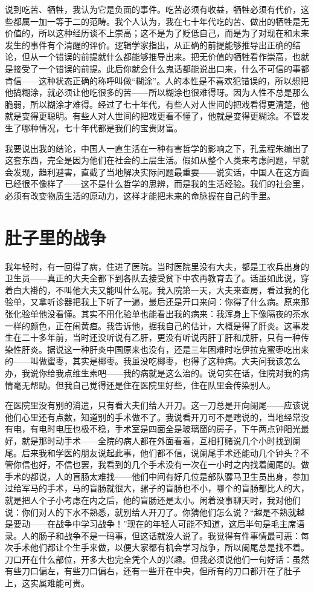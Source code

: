 说到吃苦、牺牲，我认为它是负面的事件。吃苦必须有收益，牺牲必须有代价，这些都属一加一等于二的范畴。我个人认为，我在七十年代吃的苦、做出的牺牲是无价值的，所以这种经历谈不上崇高；这不是为了贬低自己，而是为了对现在和未来发生的事件有个清醒的评价。逻辑学家指出，从正确的前提能够推导出正确的结论，但从一个错误的前提就什么都能够推导出来。把无价值的牺牲看作崇高，也就是接受了一个错误的前提。此后你就会什么鬼话都能说出口来，什么不可信的事都肯信——这种状态正确的称呼叫做“糊涂”。人的本性是不喜欢犯错误的，所以想把他搞糊涂，就必须让他吃很多的苦——所以糊涂也很难得呀。因为人性不总是那么脆弱，所以糊涂才难得。经过了七十年代，有些人对人世间的把戏看得更清楚，他就是变得更聪明。有些人对人世间的把戏更看不懂了，他就是变得更糊涂。不管发生了哪种情况，七十年代都是我们的宝贵财富。 

我要说出我的结论，中国人一直生活在一种有害哲学的影响之下，孔孟程朱编出了这套东西，完全是因为他们在社会的上层生活。假如从整个人类来考虑问题，早就会发现，趋利避害，直截了当地解决实际问题最重要——说实话，中国人在这方面已经很不像样了——这不是什么哲学的思辨，而是我的生活经验。我们的社会里，必须有改变物质生活的原动力，这样才能把未来的命脉握在自己的手里。

\chapter{肚子里的战争}

我年轻时，有一回得了病，住进了医院。当时医院里没有大夫，都是工农兵出身的卫生员——真正的大夫全都下到各队去接受贫下中农再教育去了。话虽如此说，穿着白大褂的，不叫他大夫又能叫什么呢。我入院第一天，大夫来查房，看过我的化验单，又拿听诊器把我上下听了一遍，最后还是开口来问：你得了什么病。原来那张化验单他没看懂。其实不用化验单也能看出我的病来：我浑身上下像隔夜的茶水一样的颜色，正在闹黄疸。我告诉他，据我自己的估计，大概是得了肝炎。这事发生在二十多年前，当时还没听说有乙肝，更没有听说丙肝丁肝和戊肝，只有一种传染性肝炎。据说这一种肝炎中国原来也没有，还是三年困难时吃伊拉克蜜枣吃出来的——叫做蜜枣，其实是椰枣。我虽没吃椰枣，也得了这种病。大夫问我该怎么办，我说你给我点维生素吧——我的病就是这么治的。说句实在话，住院对我的病情毫无帮助。但我自己觉得还是住在医院里好些，住在队里会传染别人。 

在医院里没有别的消遣，只有看大夫们给人开刀。这一刀总是开向阑尾——应该说他们心里还有点数，知道别的手术做不了。我说看开刀可不是瞎说的，当地经常没有电，有电时电压也极不稳，手术室是四面全是玻璃窗的房子，下午两点钟阳光最好，就是那时动手术——全院的病人都在外面看着，互相打赌说几个小时找到阑尾。后来我和学医的朋友说起此事，他们都不信，说阑尾手术还能动几个钟头？不管你信也好，不信也罢，我看到的几个手术没有一次在一小时之内找着阑尾的。做手术的都说，人的盲肠太难找——他们中间有好几位是部队骡马卫生员出身，参加过给军马的手术，马的盲肠就很大，骡子的盲肠也不小，哪个的盲肠都比人的大，就是把人个子小考虑在内之后，他的盲肠还是太小。闲着没事聊天时，我对他们说：你们对人的下水不熟悉，就别给人开刀了。你猜他们怎么说？“越是不熟就越是要动——在战争中学习战争！”现在的年轻人可能不知道，这后半句是毛主席语录。人的肠子和战争不是一码事，但这话就没人说了。我觉得有件事情最可恶：每次手术他们都让个生手来做，以便大家都有机会学习战争，所以阑尾总是找不着。刀口开在什么部位，开多大也完全凭个人的兴趣。但我必须说他们一句好话：虽然有些刀口偏左，有些刀口偏右，还有一些开在中央，但所有的刀口都开在了肚子上，这实属难能可贵。 

